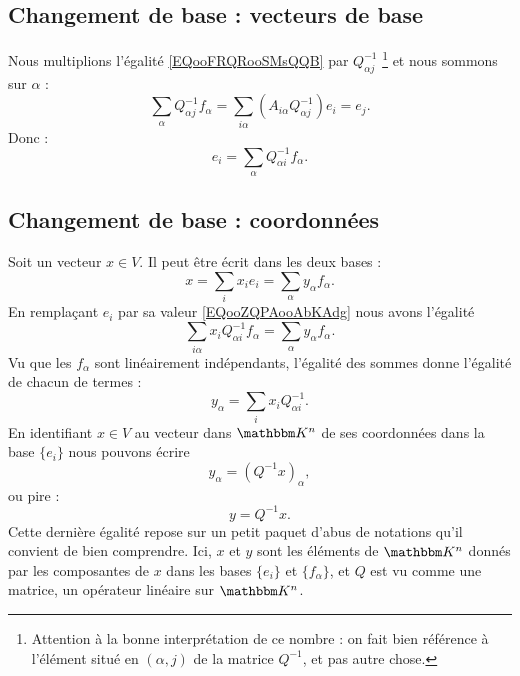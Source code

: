 \subsection{Changement de base : vecteurs de base}

Nous multiplions l'égalité \eqref{EQooFRQRooSMsQQB} par \( Q^{-1}_{\alpha j}\) \footnote{Attention à la bonne interprétation de ce nombre : on fait bien référence à l'élément situé en \( (\alpha, j) \) de la matrice \( Q^{-1} \), et pas autre chose.} et nous sommons sur \( \alpha\) :
\begin{equation}
    \sum_{\alpha}Q^{-1}_{\alpha j}f_{\alpha}=\sum_{i\alpha}(A_{i\alpha}Q^{-1}_{\alpha j})e_i=e_j.
\end{equation}
Donc :
\begin{equation}    \label{EQooZQPAooAbKAdg}
    e_i=\sum_{\alpha}Q^{-1}_{\alpha i}f_{\alpha}.
\end{equation}

\subsection{Changement de base : coordonnées}

Soit un vecteur \( x\in V\). Il peut être écrit dans les deux bases :
\begin{equation}
    x=\sum_ix_ie_i=\sum_{\alpha}y_{\alpha}f_{\alpha}.
\end{equation}
En remplaçant \( e_i\) par sa valeur \eqref{EQooZQPAooAbKAdg} nous avons l'égalité
\begin{equation}
    \sum_{i\alpha}x_iQ^{-1}_{\alpha i}f_{\alpha}=\sum_{\alpha}y_{\alpha}f_{\alpha}.
\end{equation}
Vu que les \( f_{\alpha}\) sont linéairement indépendants, l'égalité des sommes donne l'égalité de chacun de termes :
\begin{equation}        \label{EQooFXYLooCRmRdA}
    y_{\alpha}=\sum_ix_iQ^{-1}_{\alpha i}.
\end{equation}
En identifiant \( x\in V\) au vecteur dans \( \eK^n\) de ses coordonnées dans la base \( \{ e_i \}\) nous pouvons écrire
\begin{equation}
    y_{\alpha}=(Q^{-1}x)_{\alpha},
\end{equation}
ou pire :
\begin{equation}
    y=Q^{-1}x.
\end{equation}
Cette dernière égalité repose sur un petit paquet d'abus de notations qu'il convient de bien comprendre. Ici, \( x\) et \( y\) sont les éléments de \( \eK^n\) donnés par les composantes de \( x\) dans les bases \( \{ e_i \}\) et \( \{ f_{\alpha} \}\), et \( Q\) est vu comme une matrice, un opérateur linéaire sur \( \eK^n\).


